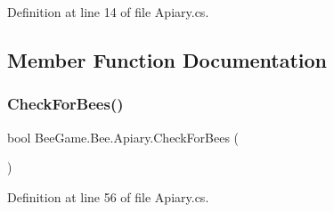 Definition at line 14 of file Apiary.\+cs.



\subsection{Member Function Documentation}
\mbox{\label{class_bee_game_1_1_bee_1_1_apiary_ac8dbe3e7896909c1fd16f4f998f7b137}} 
\subsubsection{\texorpdfstring{Check\+For\+Bees()}{CheckForBees()}}
{\footnotesize\ttfamily bool Bee\+Game.\+Bee.\+Apiary.\+Check\+For\+Bees (\begin{DoxyParamCaption}{ }\end{DoxyParamCaption})\hspace{0.3cm}{\ttfamily [private]}}



Definition at line 56 of file Apiary.\+cs.


